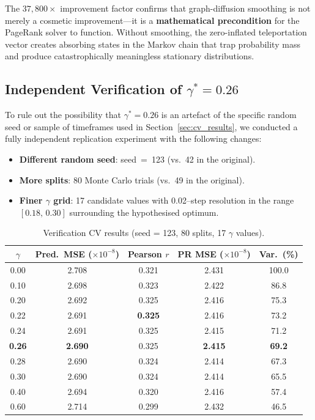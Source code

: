 \documentclass[12pt,a4paper]{article}
\theoremstyle{definition}
\theoremstyle{plain}
\begin{document}
\begin{insight}
  The $37{,}800\times$ improvement factor confirms that graph-diffusion smoothing is not
  merely a cosmetic improvement---it is a \textbf{mathematical precondition} for the
  PageRank solver to function. Without smoothing, the zero-inflated teleportation vector
  creates absorbing states in the Markov chain that trap probability mass and produce
  catastrophically meaningless stationary distributions.
\end{insight}

\subsection{Independent Verification of $\gamma^* = 0.26$}
\label{sec:verification}

To rule out the possibility that $\gamma^* = 0.26$ is an artefact of the specific
random seed or sample of timeframes used in Section~\ref{sec:cv_results}, we
conducted a fully independent replication experiment with the following changes:

\begin{itemize}
  \item \textbf{Different random seed}: seed~=~123 (vs.\ 42 in the original).
  \item \textbf{More splits}: 80 Monte Carlo trials (vs.\ 49 in the original).
  \item \textbf{Finer $\gamma$ grid}: 17 candidate values with 0.02--step resolution
    in the range $[0.18,\,0.30]$ surrounding the hypothesised optimum.
\end{itemize}

\begin{table}[H]
  \centering
  \caption{Verification CV results (seed = 123, 80 splits, 17 $\gamma$ values).}
  \label{tab:verify}
  \small
  \begin{tabular}{@{}ccccc@{}}
    \toprule
    $\gamma$ & Pred.\ MSE ($\times 10^{-8}$) & Pearson $r$
             & PR MSE ($\times 10^{-8}$) & Var.\ (\%)\\
    \midrule
    0.00 & 2.708 & 0.321 & 2.431 & 100.0\\
    0.10 & 2.698 & 0.323 & 2.422 & 86.8\\
    0.20 & 2.692 & 0.325 & 2.416 & 75.3\\
    0.22 & 2.691 & \textbf{0.325} & 2.416 & 73.2\\
    0.24 & 2.691 & 0.325 & 2.415 & 71.2\\
    \textbf{0.26} & \textbf{2.690} & 0.325 & \textbf{2.415} & \textbf{69.2}\\
    0.28 & 2.690 & 0.324 & 2.414 & 67.3\\
    0.30 & 2.690 & 0.324 & 2.414 & 65.5\\
    0.40 & 2.694 & 0.320 & 2.416 & 57.4\\
    0.60 & 2.714 & 0.299 & 2.432 & 46.5\\
    \bottomrule
  \end{tabular}
\end{table}
\end{document}
